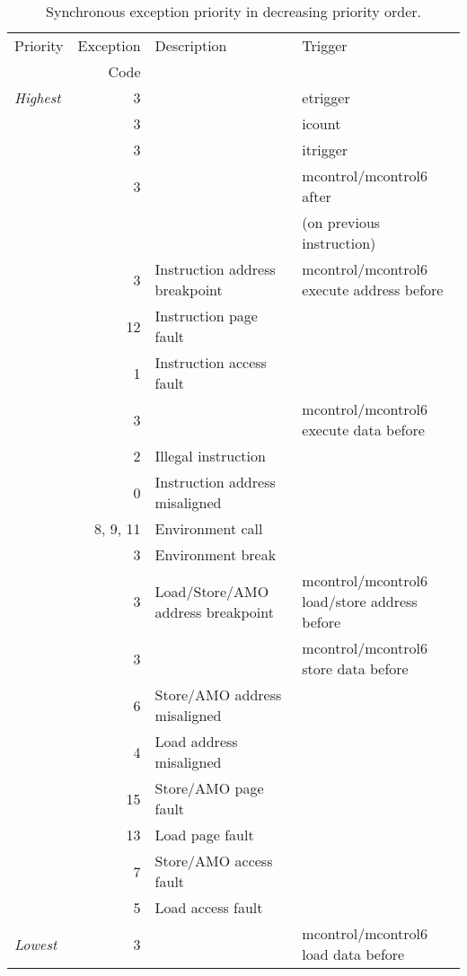 \begin{table}[H]
\centering
\label{tab:priority}
\begin{tabular}{|l|r|l|l|}
  \hline
  Priority      & Exception & Description & Trigger \\
                &      Code &             & \\
  \hline
  {\em Highest} &          3 & & etrigger \\
                &          3 & & icount \\
                &          3 & & itrigger \\
                &          3 & & mcontrol/mcontrol6 after \\
                &            & & \hspace{2em}(on previous instruction) \\
                \hline
                &          3 & Instruction address breakpoint & mcontrol/mcontrol6 execute address before \\ \hline
                &         12 & Instruction page fault & \\ \hline
                &          1 & Instruction access fault & \\ \hline
                &          3 & & mcontrol/mcontrol6 execute data before \\ \hline
                &          2 & Illegal instruction & \\
                &          0 & Instruction address misaligned & \\
                &   8, 9, 11 & Environment call & \\
                &          3 & Environment break & \\
                &          3 & Load/Store/AMO address breakpoint & mcontrol/mcontrol6 load/store address before \\
                &          3 & & mcontrol/mcontrol6 store data before \\ \hline
                &          6 & Store/AMO address misaligned & \\
                &          4 & Load address misaligned & \\ \hline
                &         15 & Store/AMO page fault & \\
                &         13 & Load page fault & \\ \hline
                &          7 & Store/AMO access fault & \\
                &          5 & Load access fault & \\
  {\em Lowest}  &          3 & & mcontrol/mcontrol6 load data before \\
  \hline
\end{tabular}
\caption{Synchronous exception priority in decreasing priority order.}
\end{table}

